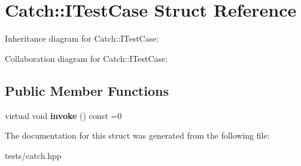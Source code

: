 \hypertarget{struct_catch_1_1_i_test_case}{}\section{Catch\+:\+:I\+Test\+Case Struct Reference}
\label{struct_catch_1_1_i_test_case}


Inheritance diagram for Catch\+:\+:I\+Test\+Case\+:


Collaboration diagram for Catch\+:\+:I\+Test\+Case\+:
\subsection*{Public Member Functions}
\begin{DoxyCompactItemize}
\item 
\mbox{\label{struct_catch_1_1_i_test_case_a678825e62e7c17297621cfeb65588c34}} 
virtual void {\bfseries invoke} () const =0
\end{DoxyCompactItemize}


The documentation for this struct was generated from the following file\+:\begin{DoxyCompactItemize}
\item 
tests/catch.\+hpp\end{DoxyCompactItemize}
